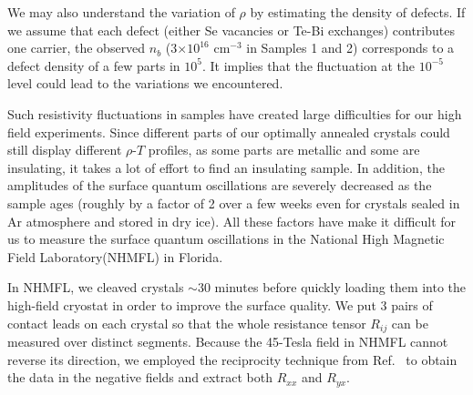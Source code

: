 We may also understand the variation of $\rho$ by estimating the density of defects. If we assume that each defect (either Se vacancies or Te-Bi exchanges) contributes one carrier, the observed $n_b$ (3$\times 10^{16}$ cm$^{-3}$ in Samples 1 and 2) corresponds to a defect density
of a few parts in $10^5$. It implies that the fluctuation at the $10^{-5}$ level could lead to the variations we encountered. 

Such resistivity fluctuations in samples have created large difficulties for our high field experiments. Since different parts of our optimally annealed crystals could still display different $\rho$-$T$ profiles, as some parts are metallic and some are insulating, it takes a lot of effort to find an insulating sample. In addition, the amplitudes of the surface quantum oscillations are severely decreased as the sample ages (roughly by a factor of 2 over a few weeks even for crystals sealed in Ar atmosphere and stored in dry ice). All these factors have make it difficult for us to measure the surface quantum oscillations in the National High Magnetic Field Laboratory(NHMFL) in Florida. 

In NHMFL, we cleaved crystals $\sim$30 minutes before quickly loading them into the high-field cryostat in order to improve the surface quality. We put 3 pairs of contact leads on each crystal so that the whole resistance tensor $R_{ij}$ can be measured over distinct segments. Because the 45-Tesla field in NHMFL cannot reverse its direction, we employed the reciprocity technique from Ref.~\cite{Sample1987} to obtain the data in the negative fields and extract both $R_{xx}$ and $R_{yx}$. 



